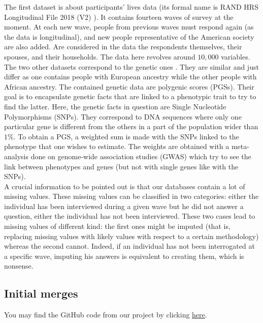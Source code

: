 \documentclass[]{article}
\begin{document}
\noindent
The first dataset is about participants’ lives data (its formal name is RAND HRS Longitudinal File 2018 (V2) \cite{hrs2014}). It contains fourteen waves of survey at the moment. At each new wave, people from previous waves must respond again (as the data is longitudinal), and new people representative of the American society are also added. Are considered in the data the respondents themselves, their spouses, and their households. The data here revolves around $10,000$ variables.\\

\noindent
The two other datasets correspond to the genetic ones \cite{genetic2021}. They are similar and just differ as one contains people with European ancestry while the other people with African ancestry. The contained genetic data are polygenic scores (PGSs). Their goal is to encapsulate genetic facts that are linked to a phenotypic trait to try to find the latter. Here, the genetic facts in question are Single Nucleotide Polymorphisms (SNPs). They correspond to DNA sequences where only one particular gene is different from the others in a part of the population wider than $1$\%. To obtain a PGS, a weighted sum is made with the SNPs linked to the phenotype that one wishes to estimate. The weights are obtained with a meta-analysis done on genome-wide association studies (GWAS) which try to see the link between phenotypes and genes (but not with single genes like with the SNPs).\\

\noindent
A crucial information to be pointed out is that our databases contain a lot of missing values. These missing values can be classified in two categories: either the individual has been interviewed during a given wave but he did not answer a question, either the individual has not been interviewed. These two cases lead to missing values of different kind: the first ones might be imputed (that is, replacing missing values with likely values with respect to a certain methodology) whereas the second cannot. Indeed, if an individual has not been interrogated at a specific wave, imputing his answers is equivalent to creating them, which is nonsense.

\subsection{Initial merges}

You may find the GitHub code from our project by clicking \href{https://github.com/jveillon/Projet_Statapp.git}{here}. \\
\end{document}
